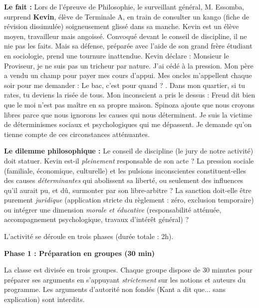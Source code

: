 \documentclass[11pt]{article}
\newcommand{\cle}[1]{{\popxbold\color{popdark}#1}}
\newcounter{popsec}
\newcounter{popsub}
\newcommand{\courssub}[1]{%
  \stepcounter{popsub}%
  \par\vspace{9pt}\noindent{\popxbold\fontsize{11.5}{13}\selectfont\color{popink}{\color{poporange}\thepopsec.\thepopsub}\hspace{6pt}#1}\par\nopagebreak\vspace{4pt}
}
\begin{document}
\textbf{Le fait :} Lors de l'épreuve de Philosophie, le surveillant général, M. Essomba, surprend \textbf{Kevin}, élève de Terminale A, en train de consulter un \guillemotleft kango \guillemotright (fiche de révision dissimulée) soigneusement glissé dans sa manche. Kevin est un élève moyen, travailleur mais angoissé. Convoqué devant le conseil de discipline, il ne nie pas les faits. Mais sa défense, préparée avec l'aide de son grand frère étudiant en sociologie, prend une tournure inattendue. Kevin déclare : \guillemotleft Monsieur le Proviseur, je ne suis pas un tricheur par nature. J'ai cédé à la pression. Mon père a vendu un champ pour payer mes cours d'appui. Mes oncles m'appellent chaque soir pour me demander : \guillemotleft Le bac, c'est pour quand ? \guillemotright. Dans mon quartier, si tu rates, tu deviens la risée de tous. Mon inconscient a pris le dessus : Freud dit bien que le moi n'est pas maître en sa propre maison. Spinoza ajoute que nous croyons libres parce que nous ignorons les causes qui nous déterminent. Je suis la victime de déterminismes sociaux et psychologiques qui me dépassent. Je demande qu'on tienne compte de ces circonstances atténuantes. \guillemotright

\textbf{Le dilemme philosophique :} Le conseil de discipline (le \guillemotleft jury \guillemotright de notre activité) doit statuer. Kevin est-il \emph{pleinement} responsable de son acte ? La \cle{pression sociale} (familiale, économique, culturelle) et les \cle{pulsions inconscientes} constituent-elles des causes \emph{déterminantes} qui abolissent sa liberté, ou seulement des \cle{influences} qu'il aurait pu, et dû, surmonter par son \cle{libre-arbitre} ? La sanction doit-elle être purement \emph{juridique} (application stricte du règlement : zéro, exclusion temporaire) ou intégrer une dimension \emph{morale et éducative} (responsabilité atténuée, accompagnement psychologique, travaux d'intérêt général) ?

\courssub{Consignes}
L'activité se déroule en trois phases (durée totale : 2h).

\textbf{Phase 1 : Préparation en groupes (30 min)}\par
La classe est divisée en trois groupes. Chaque groupe dispose de 30 minutes pour préparer ses arguments en s'appuyant \emph{strictement} sur les notions et auteurs du programme. Les arguments d'autorité non fondés (\guillemotleft Kant a dit que... \guillemotright sans explication) sont interdits.
\end{document}
